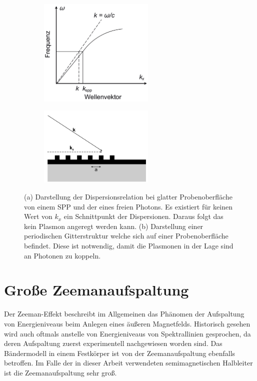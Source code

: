 \begin{figure}
    \begin{subfigure}{0.5\textwidth}
        \centering
        \includegraphics[width=5.5cm]{./Plots/disp.png}
        \caption{}
        \label{fig:disp}
    \end{subfigure}
    \begin{subfigure}{0.5\textwidth}
        \centering
        \includegraphics[width=5.5cm]{./Plots/gitter.png}
        \caption{}
        \label{fig:gitter}
    \end{subfigure}
    \caption{(a) Darstellung der Dispersionsrelation bei glatter Probenoberfläche von einem SPP und der eines freien Photons.
        Es existiert für keinen Wert von $k_x$ ein Schnittpunkt der Dispersionen.
        Daraus folgt das kein Plasmon angeregt werden kann.\cite{disp}
        (b) Darstellung einer periodischen Gitterstruktur welche sich auf einer Probenoberfläche befindet. 
        Diese ist notwendig, damit die Plasmonen in der Lage sind an Photonen zu koppeln.\cite{disp}}
    \label{fig:disp_und_gitter}
\end{figure}
\FloatBarrier

\section{Große Zeemanaufspaltung}\label{sec:Große Zeemanaufspaltung}
Der Zeeman-Effekt beschreibt im Allgemeinen das Phänomen der Aufspaltung von 
Energieniveaus beim Anlegen eines äußeren Magnetfelds. 
Historisch gesehen wird auch oftmals anstelle von Energieniveaus von Spektrallinien gesprochen, 
da deren Aufspaltung zuerst experimentell nachgewiesen worden sind.
Das Bändermodell in einem Festkörper ist von der Zeemanaufspaltung ebenfalls betroffen.
Im Falle der in dieser Arbeit verwendeten semimagnetischen Halbleiter ist die Zeemanaufspaltung
sehr groß.\cite{zeeman}

